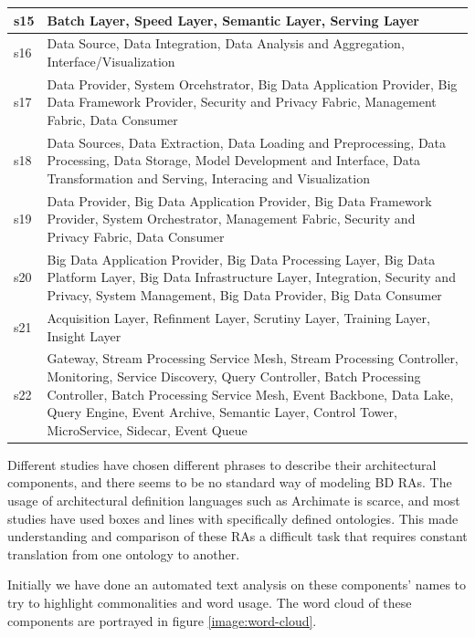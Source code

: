 \documentclass{ieeeaccess}
\begin{document}
\begin{table}
\begin{tabular}{|p{0.5cm}|p{16.5cm}|}
        \hline
        s15 & Batch Layer, Speed Layer, Semantic Layer, Serving Layer \\
        \hline
        s16 & Data Source, Data Integration, Data Analysis and Aggregation, Interface/Visualization \\
        \hline
        s17 & Data Provider, System Orcehstrator, Big Data Application Provider, Big Data Framework Provider, Security and Privacy Fabric, Management Fabric, Data Consumer \\
        \hline
        s18 & Data Sources, Data Extraction, Data Loading and Preprocessing, Data Processing, Data Storage, Model Development and Interface, Data Transformation and Serving, Interacing and Visualization \\
        \hline
        s19 & Data Provider, Big Data Application Provider, Big Data Framework Provider, System Orchestrator, Management Fabric, Security and Privacy Fabric, Data Consumer \\
        \hline
        s20 & Big Data Application Provider, Big Data Processing Layer, Big Data Platform Layer, Big Data Infrastructure Layer, Integration, Security and Privacy, System Management, Big Data Provider, Big Data Consumer \\
        \hline
        s21 & Acquisition Layer, Refinment Layer, Scrutiny Layer, Training Layer, Insight Layer \\
        \hline
        s22 & Gateway, Stream Processing Service Mesh, Stream Processing Controller, Monitoring, Service Discovery, Query Controller, Batch Processing Controller, Batch Processing Service Mesh, Event Backbone, Data Lake, Query Engine, Event Archive, Semantic Layer, Control Tower, MicroService, Sidecar, Event Queue  \\
        \hline
    \end{tabular}
\end{table}

Different studies have chosen different phrases to describe their architectural components, and there seems to be no standard way of modeling BD RAs. The usage of architectural definition languages such as Archimate is scarce, and most studies have used boxes and lines with specifically defined ontologies. This made understanding and comparison of these RAs a difficult task that requires constant translation from one ontology to another. 

Initially we have done an automated text analysis on these components' names to try to highlight commonalities and word usage. The word cloud of these components are portrayed in figure \ref{image:word-cloud}.
\end{document}
